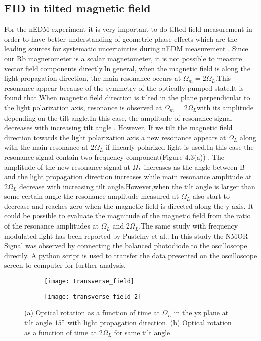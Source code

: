 \documentclass[12pt]{report}
\begin{document}
\subsection{FID in tilted magnetic field}
For the nEDM experiment it is very important to do tilted field measurement in order to have better understanding of  geometric phase effects which are the leading sources for systematic uncertainties during nEDM measurement . 
Since our Rb magnetometer is a scalar magnetometer, it is not possible to measure vector field components directly.In general, when the magnetic field is along the light propagation direction, the main resonance occurs at $\Omega_m = 2\Omega_L$.This resonance appear because of the symmetry of the optically pumped state.It is found that When magnetic field direction is tilted in the plane perpendicular to the light polarization axis, resonance is observed at  $\Omega_m = 2\Omega_L$with its amplitude depending on the tilt angle.In this case, the amplitude of resonance signal decreases with increasing tilt angle . However, If we tilt the magnetic field direction towards the light polarization axis a new resonance appears at $\Omega_L$ along with the main resonance at $2\Omega_L$ if linearly polarized light is used.In this case the resonance signal contain two frequency component(Figure 4.3(a)) . The amplitude of the new resonance signal at $\Omega_L$  increases as the angle between B and the light propagation direction increases while main resonance amplitude at $2\Omega_L$  decrease with increasing tilt angle.However,when the tilt angle is larger than some certain angle the resonance amplitude measured at $\Omega_L$ also start to decrease and reaches zero when the magnetic field is directed along the y axis.   It could be possible to evaluate the magnitude of the magnetic field from the ratio of the resonance amplitudes at $\Omega_L$ and $2\Omega_L$.The same study with frequency modulated light has been reported by Pustelny et al.\cite{PhysRevA.74.063420}. In this study the NMOR Signal was observed by connecting the balanced photodiode to the oscilloscope directly. A python script is used to transfer the data presented on the oscilloscope screen to computer for further analysis. 

\begin{figure}
    \centering
 
    \begin{subfigure}[b]{0.45\textwidth}
        \centering
        \texttt{[image: transverse\_field]}
        \caption{}
        \label{fig:three sin x}
    \end{subfigure}
    \hfill
    \begin{subfigure}[b]{0.45\textwidth}
        \centering
        \texttt{[image: transverse\_field\_2]}
        \caption{}
        \label{fig:five over x}
    \end{subfigure}
    \caption{(a) Optical rotation as a function of time at $\Omega_L$ in the yz plane at tilt angle $15\degree$ with light propagation direction. (b) Optical rotation as a function of time at $2\Omega_L$ for same tilt angle}
    \label{fig:three graphs}
\end{figure}
\end{document}
